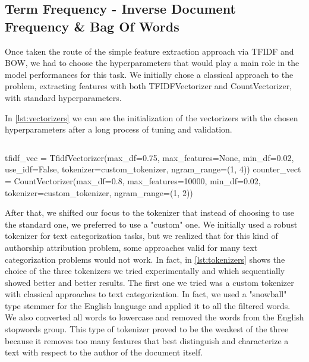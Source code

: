 \subsection{Term Frequency - Inverse Document Frequency \& Bag Of Words}
Once taken the route of the simple feature extraction approach via TFIDF and BOW, we had to choose the hyperparameters that would play a main role in the model performances for this task. 
We initially chose a classical approach to the problem, extracting features with both TFIDFVectorizer and CountVectorizer, with standard hyperparameters.


In \autoref{lst:vectorizers} we can see the initialization of the vectorizers with the chosen hyperparameters after a long process of tuning and validation.

\begin{lstlisting}[frame=none,caption={TFIDF \& BOW Vectorizer.},captionpos=b,label=lst:vectorizers]
\end{lstlisting}
\begin{python}	
	tfidf_vec = TfidfVectorizer(max_df=0.75, max_features=None,
	min_df=0.02, use_idf=False, tokenizer=custom_tokenizer, 
	ngram_range=(1, 4))
	counter_vect = CountVectorizer(max_df=0.8, max_features=10000,
	min_df=0.02, tokenizer=custom_tokenizer, ngram_range=(1, 2))
\end{python}

After that, we shifted our focus to the tokenizer that instead of choosing to use the standard one, we preferred to use a "custom" one. We initially used a robust tokenizer for text categorization tasks, but we realized that for this kind of authorship attribution problem, some approaches valid for many text categorization problems would not work.
In fact, in \autoref{lst:tokenizers} shows the choice of the three tokenizers we tried experimentally and which sequentially showed better and better results. The first one we tried was a custom tokenizer with classical approaches to text categorization. In fact, we used a "snowball" type stemmer for the English language and applied it to all the filtered words. We also converted all words to lowercase and removed the words from the English stopwords group. This type of tokenizer proved to be the weakest of the three because it removes too many features that best distinguish and characterize a text with respect to the author of the document itself.


